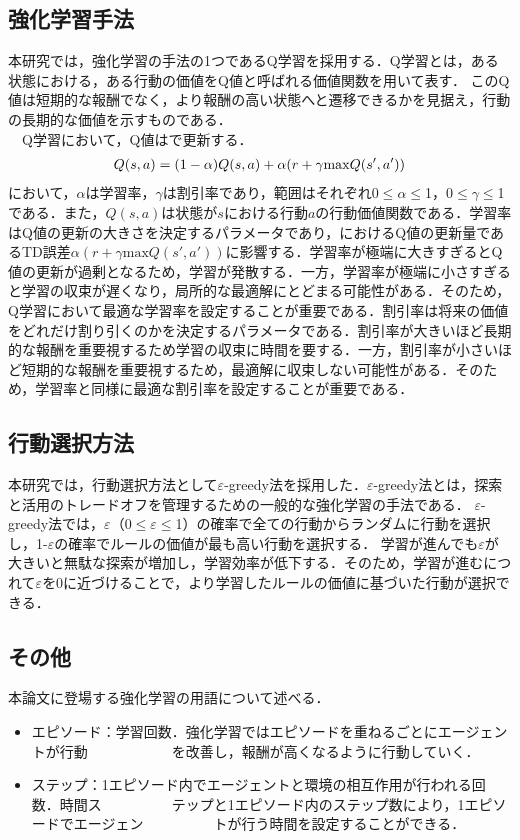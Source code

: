 \subsection{強化学習手法}
本研究では，強化学習の手法の1つであるQ学習\cite{watkins}を採用する．Q学習とは，ある状態における，ある行動の価値をQ値と呼ばれる価値関数を用いて表す．
このQ値は短期的な報酬でなく，より報酬の高い状態へと遷移できるかを見据え，行動の長期的な価値を示すものである．\\
　Q学習において，Q値はで更新する．\\
\begin{eqnarray}
  \equlabel{Q}
  Q(s,a)=(1-\alpha)Q(s,a)+\alpha(r+\gamma \mathrm{max}Q(s',a'))
\end{eqnarray}
において，$\alpha$は学習率，$\gamma$は割引率であり，範囲はそれぞれ0$\leq$$\alpha$$\leq$1，0$\leq$$\gamma$$\leq$1である．また，$Q(s,a)$は状態が$s$における行動$a$の行動価値関数である．学習率はQ値の更新の大きさを決定するパラメータであり，におけるQ値の更新量であるTD誤差$\alpha(r+\gamma \mathrm{max}Q(s',a'))$に影響する．学習率が極端に大きすぎるとQ値の更新が過剰となるため，学習が発散する．一方，学習率が極端に小さすぎると学習の収束が遅くなり，局所的な最適解にとどまる可能性がある．そのため，Q学習において最適な学習率を設定することが重要である．割引率は将来の価値をどれだけ割り引くのかを決定するパラメータである．割引率が大きいほど長期的な報酬を重要視するため学習の収束に時間を要する．一方，割引率が小さいほど短期的な報酬を重要視するため，最適解に収束しない可能性がある．そのため，学習率と同様に最適な割引率を設定することが重要である．
\subsection{行動選択方法}
本研究では，行動選択方法として$\varepsilon$-greedy法\cite{greedy}を採用した．$\varepsilon$-greedy法とは，探索と活用のトレードオフを管理するための一般的な強化学習の手法である．
$\varepsilon$-greedy法では，$\varepsilon$（0$\leq$$\varepsilon$$\leq$1）の確率で全ての行動からランダムに行動を選択し，1-$\varepsilon$の確率でルールの価値が最も高い行動を選択する．
学習が進んでも$\varepsilon$が大きいと無駄な探索が増加し，学習効率が低下する．そのため，学習が進むにつれて$\varepsilon$を0に近づけることで，より学習したルールの価値に基づいた行動が選択できる．
\subsection{その他}
本論文に登場する強化学習の用語について述べる．\\
\begin{itemize}
  \item エピソード：学習回数．強化学習ではエピソードを重ねるごとにエージェントが行動　　　　　　を改善し，報酬が高くなるように行動していく．
  \item ステップ：1エピソード内でエージェントと環境の相互作用が行われる回数．時間ス　　　　　テップと1エピソード内のステップ数により，1エピソードでエージェン　　　　　トが行う時間を設定することができる．
\end{itemize}
